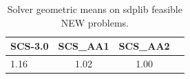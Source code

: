 \begin{table}
\centering
\caption{Solver geometric means on sdplib feasible NEW problems.}
\label{t-sdplib feasible NEW-geom_mean}
\begin{tabular}{lccc}
\toprule
 SCS-3.0 &  SCS\_AA1 &  SCS\_AA2 \\
\midrule
    1.16 &     1.02 &     1.00 \\
\bottomrule
\end{tabular}
\end{table}
